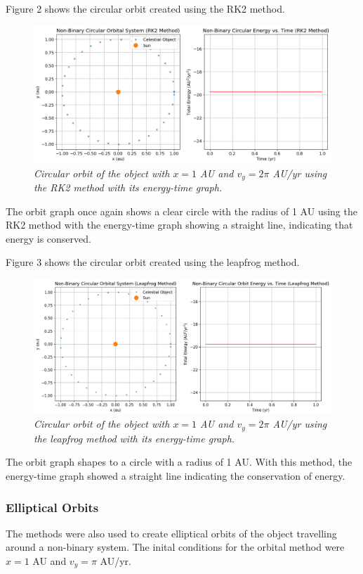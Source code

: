 \documentclass[11 pt, a4paper]{article}
\begin{document}
Figure 2 shows the circular orbit created using the RK2 method.
\begin{figure}[H] 
  \includegraphics[width=1\linewidth]{RK2/rk2circular.png}
  \centering
  \caption{\textit{Circular orbit of the object with $x = 1$ AU and $v_y = 2\pi$ AU/yr using the RK2 method with its energy-time graph.}}
\end{figure}
The orbit graph once again shows a clear circle with the radius of 1 AU using the RK2 method with the energy-time graph showing a straight line, indicating that energy is conserved.

Figure 3 shows the circular orbit created using the leapfrog method.
\begin{figure}[H]
  \includegraphics[width=1\linewidth]{Leapfrog/leapfrogcircular.png}
  \centering
  \caption{\textit{Circular orbit of the object with $x = 1$ AU and $v_y = 2\pi$ AU/yr using the leapfrog method with its energy-time graph.}}
\end{figure}
The orbit graph shapes to a circle with a radius of 1 AU. With this method, the energy-time graph showed a straight line indicating the conservation of energy.

\subsubsection{Elliptical Orbits}
The methods were also used to create elliptical orbits of the object travelling around a non-binary system. The inital conditions for the orbital method
were $x=1$ AU and $v_y = \pi$ AU/yr.
\end{document}
